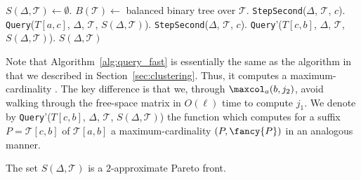 \documentclass[english, thm-restate]{lipics-v2021}
\begin{document}
 \begin{algorithm}[b]
    \caption{\textbf{PSC}($\Delta$, $\mathcal{T}$)}
    \label{alg:PSC}
    \begin{algorithmic}
    \State $S(\Delta, \mathcal{T}) \gets \emptyset$.
    \State $B(\mathcal{T}) \gets$ balanced binary tree over $\mathcal{T}$.
    \State \texttt{StepSecond}($\Delta$, $\mathcal{T}$, $c$).
    \State \texttt{Query}($T[a, c]$, $\Delta$, $\mathcal{T}$, $S(\Delta, \mathcal{T})$).
    \EndFor
    \State \texttt{StepSecond}($\Delta$, $\mathcal{T}$, $c$).
    \State \texttt{Query}'($T[c, b]$, $\Delta$, $\mathcal{T}$, $S(\Delta, \mathcal{T})$).
    \EndFor
    \EndFor
    \State \Return $S(\Delta, \mathcal{T})$
    \end{algorithmic}
  \end{algorithm}




Note that Algorithm~\ref{alg:query_fast} is essentially the same as the algorithm in~\cite{buchin2011detecting} that we described in Section~\ref{sec:clustering}. 
Thus, it computes a maximum-cardinality \pathlet.
The key difference is that we, through $\maxcol_a(b,j_2)$,  avoid walking through the free-space matrix in $O(\ell)$ time to compute $j_1$.  
We denote by  \texttt{Query}'($T[c, b]$, $\Delta$, $\mathcal{T}$, $S(\Delta, \mathcal{T})$) the function which computes for a suffix $P = \mathcal{T}[c, b]$ of $\mathcal{T}[a, b]$ a maximum-cardinality \pathlet  $(P, {\fancy{P}})$ in an analogous manner. 

\begin{lemma}
    The set $S(\Delta, \mathcal{T})$ is a $2$-approximate Pareto front. 
\end{lemma}
\end{document}
